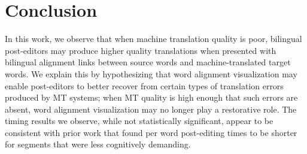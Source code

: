 
\section{Conclusion}


%
%
%

In this work, we observe that when machine translation quality is poor, bilingual post-editors may produce higher quality translations when presented with bilingual alignment links between source words and machine-translated target words.
%
%
We explain this by hypothesizing that word alignment visualization may enable post-editors to better recover from certain types of translation errors produced by MT systems; when MT quality is high enough that such errors are absent, word alignment visualization may no longer play a restorative role.
%
The timing results we observe, while not statistically significant, appear to be consistent with prior work that found per word post-editing times to be shorter for segments that were less cognitively demanding.



%
%
